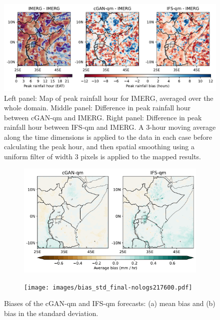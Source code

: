 \documentclass{article}
\begin{document}
\begin{figure}[t]
\centering
        \includegraphics[width=\textwidth]{images/diurnal_cycle_map_All_final-nologs_217600.pdf}
     \caption{Left panel: Map of peak rainfall hour for IMERG, averaged over the whole domain. Middle panel: Difference in peak rainfall hour between cGAN-qm and IMERG. Right panel: Difference in peak rainfall hour between IFS-qm and IMERG. A 3-hour moving average along the time dimensions is applied to the data in each case before calculating the peak hour, and then spatial smoothing using a uniform filter of width 3 pixels is applied to the mapped results.}
     \label{fig:peak_hour}
\end{figure}


\begin{figure}[!ht]
    \centering
    \begin{subfigure}{0.8\textwidth}
    \centering
     \includegraphics[width=\textwidth]{images/bias_final-nologs217600.pdf}
     \caption{}
     \end{subfigure}
     \begin{subfigure}{0.8\textwidth}
    \centering
     \texttt{[image: images/bias\_std\_final-nologs217600.pdf]}
     \caption{}
     \end{subfigure}
    
     \caption{Biases of the cGAN-qm and IFS-qm forecasts: (a) mean bias and (b) bias in the standard deviation.}
     \label{fig:bias}
\end{figure}
\end{document}
